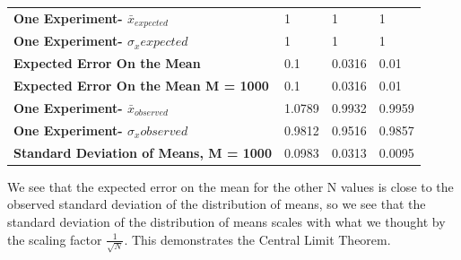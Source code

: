 \documentclass{article}
\begin{document}
\begin{enumerate}
\begin{table}[H]
\begin{tabular}{llll}
                \textbf{One Experiment- $\bar{x}_{expected}$} & 1 & 1 & 1 \\
                \textbf{One Experiment- $\sigma_{x}expected$} & 1 & 1 & 1 \\
                \textbf{Expected Error On the Mean} & 0.1 & 0.0316 & 0.01 \\
                \textbf{Expected Error On the Mean M = 1000} & 0.1 & 0.0316 & 0.01 \\
                \textbf{One Experiment- $\bar{x}_{observed}$} & 1.0789 & 0.9932 & 0.9959 \\
                \textbf{One Experiment- $\sigma_{x}observed$} & 0.9812 & 0.9516 & 0.9857 \\
                \textbf{Standard Deviation of Means, M = 1000} & 0.0983 & 0.0313 & 0.0095
                \end{tabular}
                \end{table}
                We see that the expected error on the mean for the other N values is close to the observed standard deviation of the distribution of means, so we see that the standard deviation of the distribution of means scales with what we thought by the scaling factor $\frac{1}{\sqrt{N}}$. This demonstrates the Central Limit Theorem.
        \end{enumerate}
\end{document}
